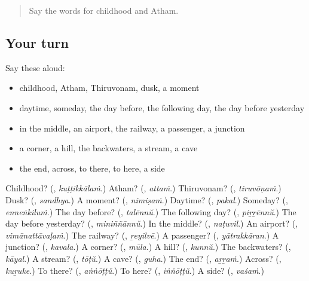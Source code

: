 \label{lesson:ML-R240-second-pass-words-from-chapters-236-240}



\begin{quote}
Say the words for childhood and Atham.
\end{quote}

\subsection*{Your turn}
Say these aloud:

\begin{itemize}
\raggedright
  \item childhood, Atham, Thiruvonam, dusk, a moment
  \item daytime, someday, the day before, the following day, the day before yesterday
  \item in the middle, an airport, the railway, a passenger, a junction
  \item a corner, a hill, the backwaters, a stream, a cave
  \item the end, across, to there, to here, a side
\end{itemize}

\begin{tcolorbox}[breakable,colback=teal!4,colframe=teal!35!black,title={Before you move on}]
Childhood? (\textbf{}, \emph{kuṭṭikkālaṁ}.) Atham? (\textbf{}, \emph{attaṁ}.) Thiruvonam? (\textbf{}, \emph{tiruvōṇaṁ}.) Dusk? (\textbf{}, \emph{sandhya}.) A moment? (\textbf{}, \emph{nimiṣaṁ}.) Daytime? (\textbf{}, \emph{pakal}.) Someday? (\textbf{}, \emph{enneṅkiluṁ}.) The day before? (\textbf{}, \emph{talēnnŭ}.) The following day? (\textbf{}, \emph{piṟṟēnnŭ}.) The day before yesterday? (\textbf{}, \emph{miniññānnŭ}.) In the middle? (\textbf{}, \emph{naṭuvil}.) An airport? (\textbf{}, \emph{vimānattāvaḷaṁ}.) The railway? (\textbf{}, \emph{ṟeyilvē}.) A passenger? (\textbf{}, \emph{yātrakkāran}.) A junction? (\textbf{}, \emph{kavala}.) A corner? (\textbf{}, \emph{mūla}.) A hill? (\textbf{}, \emph{kunnŭ}.) The backwaters? (\textbf{}, \emph{kāyal}.) A stream? (\textbf{}, \emph{tōṭŭ}.) A cave? (\textbf{}, \emph{guha}.) The end? (\textbf{}, \emph{aṟṟaṁ}.) Across? (\textbf{}, \emph{kuṟuke}.) To there? (\textbf{}, \emph{aṅṅōṭṭŭ}.) To here? (\textbf{}, \emph{iṅṅōṭṭŭ}.) A side? (\textbf{}, \emph{vaśaṁ}.)
\end{tcolorbox}
